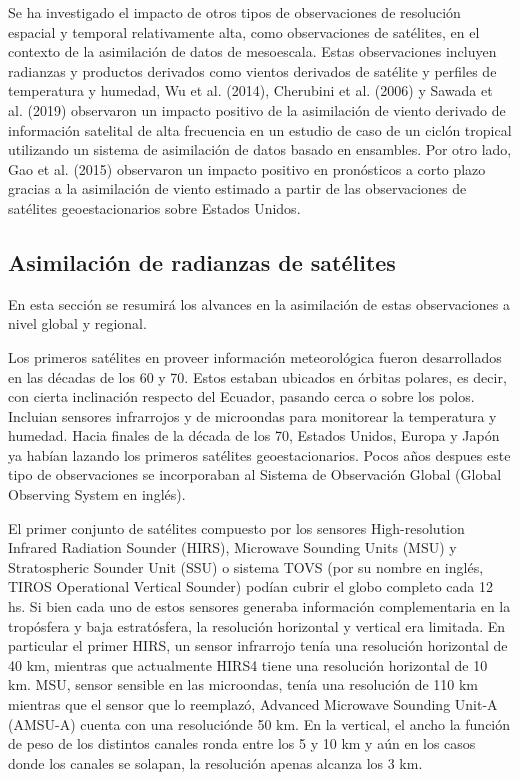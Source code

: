 \documentclass[12pt,twoside]{reedthesis}
\begin{document}
Se ha investigado el impacto de otros tipos de observaciones de resolución espacial y temporal relativamente alta, como observaciones de satélites, en el contexto de la asimilación de datos de mesoescala. Estas observaciones incluyen radianzas y productos derivados como vientos derivados de satélite y perfiles de temperatura y humedad, Wu et al. (2014), Cherubini et al. (2006) y Sawada et al. (2019) observaron un impacto positivo de la asimilación de viento derivado de información satelital de alta frecuencia en un estudio de caso de un ciclón tropical utilizando un sistema de asimilación de datos basado en ensambles. Por otro lado, Gao et al. (2015) observaron un impacto positivo en pronósticos a corto plazo gracias a la asimilación de viento estimado a partir de las observaciones de satélites geoestacionarios sobre Estados Unidos.

\hypertarget{asimilaciuxf3n-de-radianzas-de-satuxe9lites}{%
\subsection{Asimilación de radianzas de satélites}\label{asimilaciuxf3n-de-radianzas-de-satuxe9lites}}

En esta sección se resumirá los alvances en la asimilación de estas observaciones a nivel global y regional.

Los primeros satélites en proveer información meteorológica fueron desarrollados en las décadas de los 60 y 70. Estos estaban ubicados en órbitas polares, es decir, con cierta inclinación respecto del Ecuador, pasando cerca o sobre los polos. Incluian sensores infrarrojos y de microondas para monitorear la temperatura y humedad. Hacia finales de la década de los 70, Estados Unidos, Europa y Japón ya habían lazando los primeros satélites geoestacionarios. Pocos años despues este tipo de observaciones se incorporaban al Sistema de Observación Global (Global Observing System en inglés).

El primer conjunto de satélites compuesto por los sensores High-resolution Infrared Radiation Sounder (HIRS), Microwave Sounding Units (MSU) y Stratospheric Sounder Unit (SSU) o sistema TOVS (por su nombre en inglés, TIROS Operational Vertical Sounder) podían cubrir el globo completo cada 12 hs. Si bien cada uno de estos sensores generaba información complementaria en la tropósfera y baja estratósfera, la resolución horizontal y vertical era limitada. En particular el primer HIRS, un sensor infrarrojo tenía una resolución horizontal de 40 km, mientras que actualmente HIRS4 tiene una resolución horizontal de 10 km. MSU, sensor sensible en las microondas, tenía una resolución de 110 km mientras que el sensor que lo reemplazó, Advanced Microwave Sounding Unit-A (AMSU-A) cuenta con una resoluciónde 50 km. En la vertical, el ancho la función de peso de los distintos canales ronda entre los 5 y 10 km y aún en los casos donde los canales se solapan, la resolución apenas alcanza los 3 km.
\end{document}
